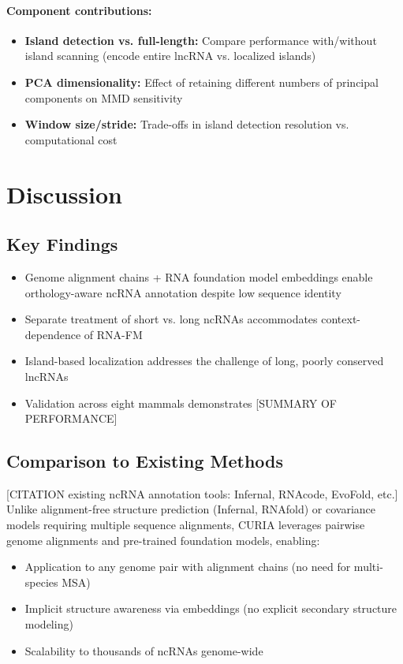 \documentclass[11pt]{article}
\begin{document}
\paragraph{Component contributions:}
\begin{itemize}
\item \textbf{Island detection vs. full-length:} Compare performance with/without island scanning (encode entire lncRNA vs. localized islands)
\item \textbf{PCA dimensionality:} Effect of retaining different numbers of principal components on MMD sensitivity
\item \textbf{Window size/stride:} Trade-offs in island detection resolution vs. computational cost
\end{itemize}


\section{Discussion}

\subsection{Key Findings}
\begin{itemize}
\item Genome alignment chains + RNA foundation model embeddings enable orthology-aware ncRNA annotation despite low sequence identity
\item Separate treatment of short vs. long ncRNAs accommodates context-dependence of RNA-FM
\item Island-based localization addresses the challenge of long, poorly conserved lncRNAs
\item Validation across eight mammals demonstrates [SUMMARY OF PERFORMANCE]
\end{itemize}

\subsection{Comparison to Existing Methods}
[CITATION existing ncRNA annotation tools: Infernal, RNAcode, EvoFold, etc.]
Unlike alignment-free structure prediction (Infernal, RNAfold) or covariance models requiring multiple sequence alignments, CURIA leverages pairwise genome alignments and pre-trained foundation models, enabling:
\begin{itemize}
\item Application to any genome pair with alignment chains (no need for multi-species MSA)
\item Implicit structure awareness via embeddings (no explicit secondary structure modeling)
\item Scalability to thousands of ncRNAs genome-wide
\end{itemize}
\end{document}

